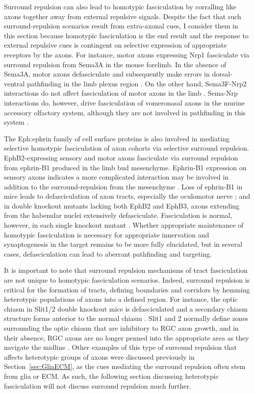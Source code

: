 Surround repulsion can also lead to homotypic fasciculation by corralling like axons together away from external repulsive signals.
Despite the fact that such surround-repulsion scenarios result from extra-axonal cues, I consider them in this section because homotypic fasciculation is the end result and the response to external repulsive cues is contingent on selective expression of appropriate receptors by the axons.
For instance, motor axons expressing Nrp1 fasciculate via surround repulsion from Sema3A in the mouse forelimb.
In the absence of Sema3A, motor axons defasciculate and subsequently make errors in dorsal-ventral pathfinding in the limb plexus region \cite{huber2005distinct}.
On the other hand, Sema3F-Nrp2 interactions do not affect fasciculation of motor axons in the limb \cite{huber2005distinct}.
Sema-Nrp interactions do, however, drive fasciculation of vomeronasal axons in the murine accessory olfactory system, although they are not involved in pathfinding in this system \cite{cloutier2002neuropilin}.

The Eph:ephrin family of cell surface proteins is also involved in mediating selective homotypic fasciculation of axon cohorts via selective surround repulsion.
EphB2-expressing sensory and motor axons fasciculate via surround repulsion from ephrin-B1 produced in the limb bud mesenchyme.
Ephrin-B1 expression on sensory axons indicates a more complicated interaction may be involved in addition to the surround-repulsion from the mesenchyme \cite{luxey2013eph}.
Loss of ephrin-B1 in mice leads to defasciculation of axon tracts, especially the oculomotor nerve \cite{davy2004ephrin}; and in double knockout mutants lacking both EphB2 and EphB3, axons extending from the habenular nuclei extensively defasciculate.
Fasciculation is normal, however, in each single knockout mutant \cite{orioli1996sek4}.
Whether appropriate maintenance of homotypic fasciculation is necessary for appropriate innervation and synaptogenesis in the target remains to be more fully elucidated, but in several cases, defasciculation can lead to aberrant pathfinding and targeting.

It is important to note that surround repulsion mechanisms of tract fasciculation are not unique to homotypic fasciculation scenarios.
Indeed, surround repulsion is critical for the formation of tracts, defining boundaries and corridors by hemming heterotypic populations of axons into a defined region.
For instance, the optic chiasm in Slit1/2 double knockout mice is defasciculated and a secondary chiasm structure forms anterior to the normal chiasm \cite{plump2002slit1}.
Slit1 and 2 normally define zones surrounding the optic chiasm that are inhibitory to RGC axon growth, and in their absence, RGC axons are no longer penned into the appropriate area as they navigate the midline \cite{plump2002slit1}.
Other examples of this type of surround repulsion that affects heterotypic groups of axons were discussed previously in Section~\ref{sec:GliaECM}, as the cues mediating the surround repulsion often stem from glia or ECM.
As such, the following section discussing heterotypic fasciculation will not discuss surround repulsion much further.
